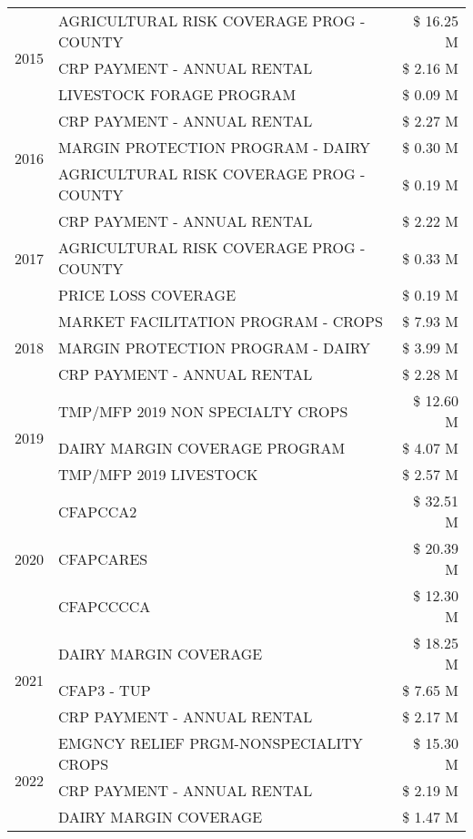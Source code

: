 \begin{tabular}{llr}
\cline{1-3}
\multirow[t]{3}{*}{2015} & AGRICULTURAL RISK COVERAGE PROG - COUNTY & \$ 16.25 M \\
 & CRP PAYMENT - ANNUAL RENTAL & \$ 2.16 M \\
 & LIVESTOCK FORAGE PROGRAM & \$ 0.09 M \\
\cline{1-3}
\multirow[t]{3}{*}{2016} & CRP PAYMENT - ANNUAL RENTAL & \$ 2.27 M \\
 & MARGIN PROTECTION PROGRAM - DAIRY & \$ 0.30 M \\
 & AGRICULTURAL RISK COVERAGE PROG - COUNTY & \$ 0.19 M \\
\cline{1-3}
\multirow[t]{3}{*}{2017} & CRP PAYMENT - ANNUAL RENTAL & \$ 2.22 M \\
 & AGRICULTURAL RISK COVERAGE PROG - COUNTY & \$ 0.33 M \\
 & PRICE LOSS COVERAGE & \$ 0.19 M \\
\cline{1-3}
\multirow[t]{3}{*}{2018} & MARKET FACILITATION PROGRAM - CROPS & \$ 7.93 M \\
 & MARGIN PROTECTION PROGRAM - DAIRY & \$ 3.99 M \\
 & CRP PAYMENT - ANNUAL RENTAL & \$ 2.28 M \\
\cline{1-3}
\multirow[t]{3}{*}{2019} & TMP/MFP 2019 NON SPECIALTY CROPS & \$ 12.60 M \\
 & DAIRY MARGIN COVERAGE PROGRAM & \$ 4.07 M \\
 & TMP/MFP 2019 LIVESTOCK & \$ 2.57 M \\
\cline{1-3}
\multirow[t]{3}{*}{2020} & CFAPCCA2 & \$ 32.51 M \\
 & CFAPCARES & \$ 20.39 M \\
 & CFAPCCCCA & \$ 12.30 M \\
\cline{1-3}
\multirow[t]{3}{*}{2021} & DAIRY MARGIN COVERAGE & \$ 18.25 M \\
 & CFAP3 - TUP & \$ 7.65 M \\
 & CRP PAYMENT - ANNUAL RENTAL & \$ 2.17 M \\
\cline{1-3}
\multirow[t]{3}{*}{2022} & EMGNCY RELIEF PRGM-NONSPECIALITY CROPS & \$ 15.30 M \\
 & CRP PAYMENT - ANNUAL RENTAL & \$ 2.19 M \\
 & DAIRY MARGIN COVERAGE & \$ 1.47 M \\
\cline{1-3}
\bottomrule
\end{tabular}
